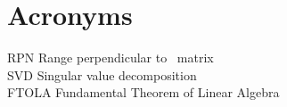 \chapter*{Acronyms}

RPN \quad Range perpendicular to \ns \ matrix \\

SVD \quad Singular value decomposition \\

FTOLA \quad Fundamental Theorem of Linear Algebra \\


\endinput